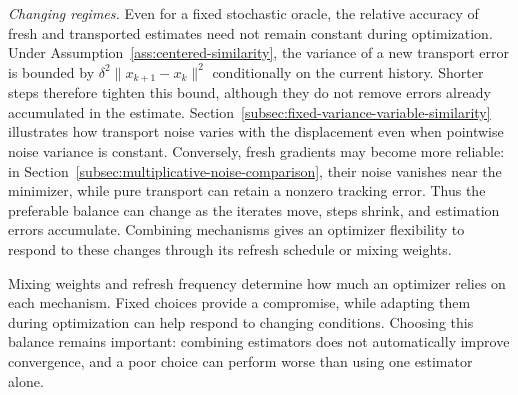 \emph{Changing regimes.} Even for a fixed stochastic oracle, the
relative accuracy of fresh and transported estimates need not remain
constant during optimization. Under
Assumption~\ref{ass:centered-similarity}, the variance of a new
transport error is bounded by
$\delta^2\|x_{k+1}-x_k\|^2$ conditionally on the current history.
Shorter steps therefore tighten this bound, although they do not
remove errors already accumulated in the estimate.
Section~\ref{subsec:fixed-variance-variable-similarity} illustrates
how transport noise varies with the displacement even when pointwise
noise variance is constant. Conversely, fresh gradients may become
more reliable: in Section~\ref{subsec:multiplicative-noise-comparison},
their noise vanishes near the minimizer, while pure transport can
retain a nonzero tracking error. Thus the preferable balance can
change as the iterates move, steps shrink, and estimation errors
accumulate. Combining mechanisms gives an optimizer flexibility to
respond to these changes through its refresh schedule or mixing weights.

Mixing weights and refresh frequency determine how much an optimizer
relies on each mechanism. Fixed choices provide a compromise, while
adapting them during optimization can help respond to changing
conditions. Choosing this balance remains important: combining
estimators does not automatically improve convergence, and a poor
choice can perform worse than using one estimator alone.
